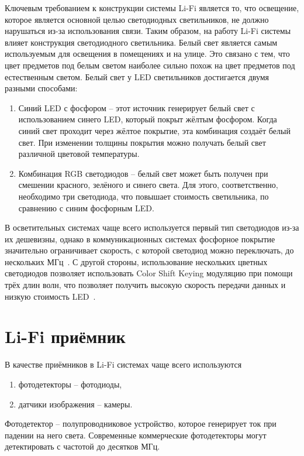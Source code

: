 Ключевым требованием к конструкции системы Li-Fi является то, что освещение, которое является основной целью светодиодных светильников, не должно нарушаться из-за использования связи. Таким образом, на работу Li-Fi системы влияет конструкция светодиодного светильника. Белый свет является самым используемым для освещения в помещениях и на улице. Это связано с тем, что цвет предметов под белым светом наиболее сильно похож на цвет предметов под естественным светом. Белый свет у LED светильников достигается двумя разными способами: 

\begin{enumerate}
    \item Синий LED с фосфором \--- этот источник генерирует белый свет с использованием синего LED, который покрыт жёлтым фосфором. Когда синий свет проходит через жёлтое покрытие, эта комбинация создаёт белый свет. При изменении толщины покрытия можно получать белый свет различной цветовой температуры.
    \item Комбинация RGB светодиодов \--- белый свет может быть получен при смешении красного, зелёного и синего света. Для этого, соответственно, необходимо три светодиода, что повышает стоимость светильника, по сравнению с синим фосфорным LED. 
\end{enumerate}

В осветительных системах чаще всего используется первый тип светодиодов из-за их дешевизны, однако в коммуникационных системах фосфорное покрытие значительно ограничивает скорость, с которой светодиод можно переключать, до нескольких МГц~\cite{Khalid2012}. С другой стороны, использование нескольких цветных светодиодов позволяет использовать Color Shift Keying модуляцию при помощи трёх длин волн, что позволяет получить высокую скорость передачи данных и низкую стоимость LED~\cite{Bian2019}.

\section{Li-Fi приёмник}

В качестве приёмников в Li-Fi системах чаще всего используются

\begin{enumerate}
    \item фотодетекторы \--- фотодиоды,
    \item датчики изображения \--- камеры.
\end{enumerate}

Фотодетектор \--- полупроводниковое устройство, которое генерирует ток при падении на него света. Современные коммерческие фотодетекторы могут детектировать с частотой до десятков МГц. 

